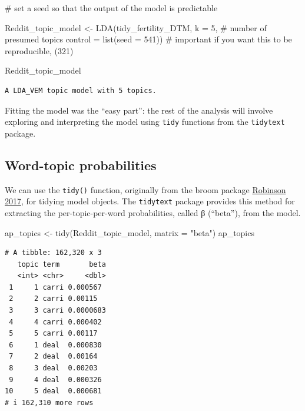 \documentclass[
  letterpaper,
  DIV=11,
  numbers=noendperiod]{scrreprt}
\newenvironment{Shaded}{\begin{snugshade}}{\end{snugshade}}
\newcommand{\AttributeTok}[1]{\textcolor[rgb]{0.40,0.45,0.13}{#1}}
\newcommand{\CommentTok}[1]{\textcolor[rgb]{0.37,0.37,0.37}{#1}}
\newcommand{\DecValTok}[1]{\textcolor[rgb]{0.68,0.00,0.00}{#1}}
\newcommand{\FunctionTok}[1]{\textcolor[rgb]{0.28,0.35,0.67}{#1}}
\newcommand{\NormalTok}[1]{\textcolor[rgb]{0.00,0.23,0.31}{#1}}
\newcommand{\OtherTok}[1]{\textcolor[rgb]{0.00,0.23,0.31}{#1}}
\newcommand{\StringTok}[1]{\textcolor[rgb]{0.13,0.47,0.30}{#1}}
\begin{document}
\begin{Shaded}
\begin{Highlighting}[]
\CommentTok{\# set a seed so that the output of the model is predictable}

\NormalTok{Reddit\_topic\_model }\OtherTok{\textless{}{-}} \FunctionTok{LDA}\NormalTok{(tidy\_fertility\_DTM,}
              \AttributeTok{k =} \DecValTok{5}\NormalTok{, }\CommentTok{\# number of presumed topics}
              \AttributeTok{control =} \FunctionTok{list}\NormalTok{(}\AttributeTok{seed =} \DecValTok{541}\NormalTok{)) }\CommentTok{\# important if you want this to be reproducible, (321)}

\NormalTok{Reddit\_topic\_model}
\end{Highlighting}
\end{Shaded}

\begin{verbatim}
A LDA_VEM topic model with 5 topics.
\end{verbatim}

Fitting the model was the ``easy part'': the rest of the analysis will
involve exploring and interpreting the model using \texttt{tidy}
functions from the \texttt{tidytext} package.

\hypertarget{word-topic-probabilities}{%
\subsection{Word-topic probabilities}\label{word-topic-probabilities}}

We can use the \texttt{tidy()} function, originally from the broom
package
\href{https://cran.r-project.org/web/packages/broom/index.html}{Robinson
2017}, for tidying model objects. The \texttt{tidytext} package provides
this method for extracting the per-topic-per-word probabilities, called
β (``beta''), from the model.

\begin{Shaded}
\begin{Highlighting}[]
\NormalTok{ap\_topics }\OtherTok{\textless{}{-}} \FunctionTok{tidy}\NormalTok{(Reddit\_topic\_model, }\AttributeTok{matrix =} \StringTok{"beta"}\NormalTok{)}
\NormalTok{ap\_topics}
\end{Highlighting}
\end{Shaded}

\begin{verbatim}
# A tibble: 162,320 x 3
   topic term       beta
   <int> <chr>     <dbl>
 1     1 carri 0.000567 
 2     2 carri 0.00115  
 3     3 carri 0.0000683
 4     4 carri 0.000402 
 5     5 carri 0.00117  
 6     1 deal  0.000830 
 7     2 deal  0.00164  
 8     3 deal  0.00203  
 9     4 deal  0.000326 
10     5 deal  0.000681 
# i 162,310 more rows
\end{verbatim}
\end{document}
